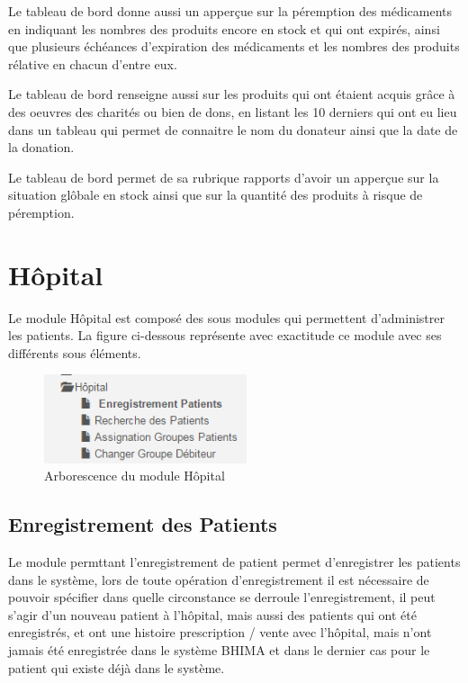 \documentclass[12pt,a4paper]{report}
\begin{document}
Le tableau de bord donne aussi un apperçue sur la péremption des médicaments en indiquant les nombres des produits encore en stock et qui ont expirés, ainsi que plusieurs échéances d'expiration des médicaments et les nombres des produits rélative en chacun d'entre eux.

Le tableau de bord renseigne aussi sur les produits qui ont étaient acquis grâce à des oeuvres des charités ou bien de dons, en listant les 10 derniers qui ont eu lieu dans un tableau qui permet de connaitre le nom du donateur ainsi que la date de la donation.

Le tableau de bord permet de sa rubrique rapports d'avoir un apperçue sur la situation glôbale en stock ainsi que sur la quantité des produits à risque de péremption.


\newpage
\chapter{Hôpital}        

Le module Hôpital est composé des sous modules qui permettent d'administrer les patients. La figure ci-dessous représente avec exactitude ce module avec ses différents sous éléments.

\begin{figure}[h]
\begin{center}
\includegraphics[width=6cm]{pic/HopitalArbo.png}
\end{center}
\caption{Arborescence du module Hôpital}
\label{Arborescence du module Hôpital}
\end{figure}

\section{Enregistrement des Patients}
Le module permttant l'enregistrement de patient permet d'enregistrer les patients dans le système, lors de toute opération d'enregistrement il est nécessaire de pouvoir spécifier dans quelle circonstance se derroule l'enregistrement, il peut s'agir d'un nouveau patient à l'hôpital, mais aussi des patients qui ont été enregistrés, et ont une histoire prescription / vente avec l'hôpital, mais n'ont jamais été enregistrée dans le système BHIMA et dans le dernier cas pour le patient qui existe déjà dans le système. 
\end{document}
